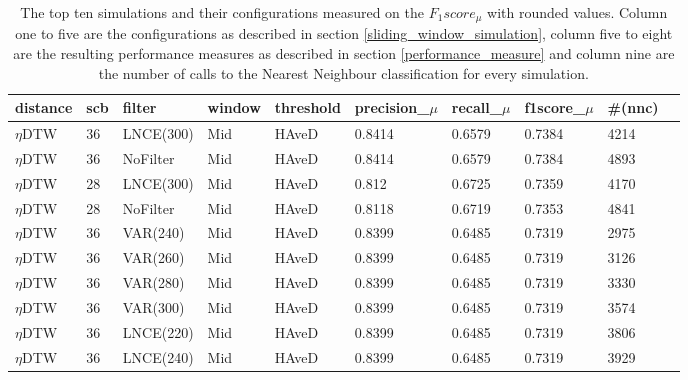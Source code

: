 \begin{table}[H]
    \begin{center}
        \begin{tabular*}{\textwidth}{l @{\extracolsep{\fill}} lllllllll}
            \hline
            \textbf{distance} & \textbf{scb} & \textbf{filter} & \textbf{window} & \textbf{threshold} & \textbf{precision\_$\mu$} & \textbf{recall\_$\mu$} & \textbf{f1score\_$\mu$} & \textbf{\#(nnc)}\\
            \hline
            $\eta$DTW & 36 & LNCE(300) & Mid  & HAveD & 0.8414 & 0.6579 & 0.7384 & 4214\\
            $\eta$DTW & 36 & NoFilter & Mid  & HAveD & 0.8414 & 0.6579 & 0.7384 & 4893\\
            $\eta$DTW & 28 & LNCE(300) & Mid  & HAveD & 0.812 & 0.6725 & 0.7359 & 4170\\
            $\eta$DTW & 28 & NoFilter & Mid  & HAveD & 0.8118 & 0.6719 & 0.7353 & 4841\\
            $\eta$DTW & 36 & VAR(240) & Mid  & HAveD & 0.8399 & 0.6485 & 0.7319 & 2975\\
            $\eta$DTW & 36 & VAR(260) & Mid & HAveD & 0.8399 & 0.6485 & 0.7319 & 3126\\
            $\eta$DTW & 36 & VAR(280) & Mid & HAveD & 0.8399 & 0.6485 & 0.7319 & 3330\\
            $\eta$DTW & 36 & VAR(300) & Mid & HAveD & 0.8399 & 0.6485 & 0.7319 & 3574\\
            $\eta$DTW & 36 & LNCE(220) & Mid & HAveD & 0.8399 & 0.6485 & 0.7319 & 3806\\
            $\eta$DTW & 36 & LNCE(240) & Mid & HAveD & 0.8399 & 0.6485 & 0.7319 & 3929\\
            \hline
        \end{tabular*}
    \end{center}
    \caption{The top ten simulations and their configurations measured on the $F_{1}score_{\mu}$ with rounded values.
    Column one to five are the configurations as described in section \ref{sliding_window_simulation}, column five to
    eight are the resulting performance measures as described in section \ref{performance_measure} and column nine are
    the number of calls to the Nearest Neighbour classification for every simulation.}
	\label{tab:result}
\end{table}

